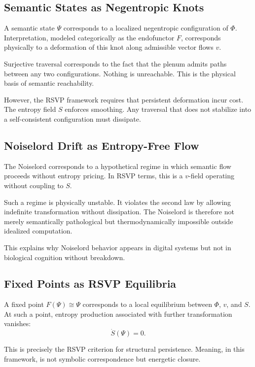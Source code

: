 \documentclass[12pt]{article}
\theoremstyle{remark}
\begin{document}
\subsection{Semantic States as Negentropic Knots}

A semantic state $\Psi$ corresponds to a localized negentropic configuration of $\Phi$. Interpretation, modeled categorically as the endofunctor $F$, corresponds physically to a deformation of this knot along admissible vector flows $v$.

Surjective traversal corresponds to the fact that the plenum admits paths between any two configurations. Nothing is unreachable. This is the physical basis of semantic reachability.

However, the RSVP framework requires that persistent deformation incur cost. The entropy field $S$ enforces smoothing. Any traversal that does not stabilize into a self-consistent configuration must dissipate.

\subsection{Noiselord Drift as Entropy-Free Flow}

The Noiselord corresponds to a hypothetical regime in which semantic flow proceeds without entropy pricing. In RSVP terms, this is a $v$-field operating without coupling to $S$.

Such a regime is physically unstable. It violates the second law by allowing indefinite transformation without dissipation. The Noiselord is therefore not merely semantically pathological but thermodynamically impossible outside idealized computation.

This explains why Noiselord behavior appears in digital systems but not in biological cognition without breakdown.

\subsection{Fixed Points as RSVP Equilibria}

A fixed point $F(\Psi) \cong \Psi$ corresponds to a local equilibrium between $\Phi$, $v$, and $S$. At such a point, entropy production associated with further transformation vanishes:
\[
\dot{S}(\Psi) = 0.
\]

This is precisely the RSVP criterion for structural persistence. Meaning, in this framework, is not symbolic correspondence but energetic closure.
\end{document}
